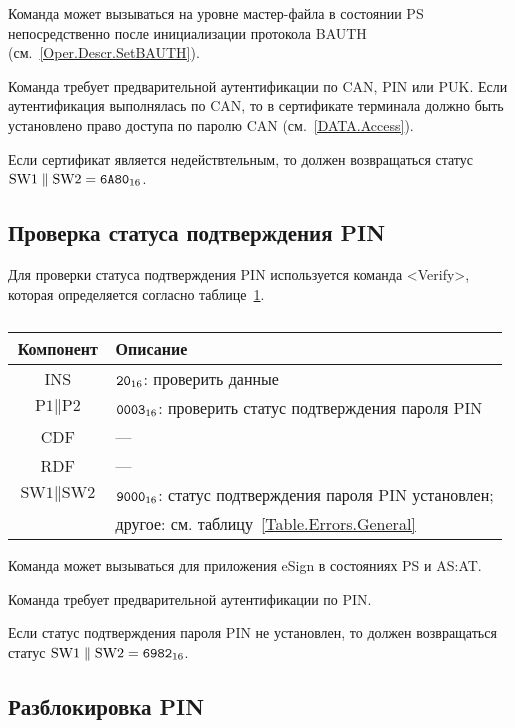 Команда может вызываться на уровне мастер-файла 
в состоянии PS непосредственно после 
инициализации протокола BAUTH (см.~\ref{Oper.Descr.SetBAUTH}).

Команда требует предварительной аутентификации по CAN, PIN или PUK. 
Если аутентификация выполнялась по CAN,
то в сертификате терминала должно быть установлено 
право доступа по паролю CAN  (см.~\ref{DATA.Access}).

Если сертификат является недействтельным, то должен 
возвращаться статус 
$\text{SW1} \parallel \text{SW2} = \texttt{6A80}_{16}$.

\subsection{Проверка статуса подтверждения PIN}
\label{Oper.Descr.VerifyAuth}

Для проверки статуса подтверждения PIN
используется команда <Verify>, 
которая определяется согласно 
таблице~\ref{Table.Oper.VerifyAuthCmd}.

\begin{table}[hbt]
\caption{}\label{Table.Oper.VerifyAuthCmd}
\begin{tabular}{|c|p{14cm}|}
\hline
Компонент & Описание \\
\hline
\hline
INS & $\texttt{20}_{16}$: проверить данные\\
\hline
$\text{P1} \parallel \text{P2}$ & $\texttt{0003}_{16}$: проверить статус подтверждения пароля PIN \\
\hline
CDF & --- \\
\hline 
RDF &  --- \\
\hline
$\text{SW1} \parallel \text{SW2}$ & $\texttt{9000}_{16}$: 
 статус подтверждения пароля PIN установлен;\\
 & другое: см. таблицу~\ref{Table.Errors.General} \\
\hline
\end{tabular}
\end{table}

Команда может вызываться для приложения eSign в состояниях PS и AS:AT.

Команда требует предварительной аутентификации по PIN.

Если статус подтверждения пароля PIN не установлен, то должен 
возвращаться статус $\text{SW1} \parallel \text{SW2} = \texttt{6982}_{16}$.

\subsection{Разблокировка PIN}
\label{Oper.Descr.UnblockPIN}

